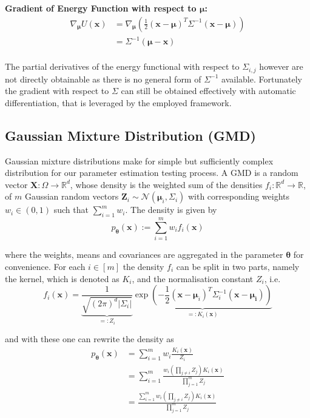 \textbf{Gradient of Energy Function with respect to $\bm{\mu}$:}
\[
\begin{aligned}
	\nabla_{\bm{\mu}} U(\bm{x}) &= \nabla_{\bm{\mu}} \left( \frac{1}{2} (\bm{x} - \bm{\mu})^T \Sigma^{-1} (\bm{x} - \bm{\mu}) \right) \\
	&= \Sigma^{-1} (\bm{\mu} - \bm{x}) \\
\end{aligned}
\]

The partial derivatives of the energy functional with respect to $\Sigma_{i,j}$ however are not directly obtainable as there is no general form of $\Sigma^{-1}$ available.
Fortunately the gradient with respect to $\Sigma$ can still be obtained effectively with automatic differentiation, that is leveraged by the employed framework.


\subsection{Gaussian Mixture Distribution (GMD)}

Gaussian mixture distributions make for simple but sufficiently complex distribution for our parameter estimation testing process.
A GMD is a random vector  $\bm{X} : \Omega \to \mathbb{R}^d$, whose density is the weighted sum of the densities $f_i : \mathbb{R}^d \to \mathbb{R}$, 
of $m$ Gaussian random vectors $\bm{Z}_i \sim \mathcal{N}(\bm{\mu}_i , \Sigma_i )$ with corresponding weights $w_i \in (0, 1)$ such that $\sum_{i = 1}^m w_i$.
The density is given by
\[
	p_{\bm{\theta}} (\bm{x}) := \sum_{i = 1}^m w_i f_i(\bm{x})
\]

where the weights, means and covariances are aggregated in the parameter $\bm{\theta}$ for convenience.
For each $i \in [m]$ the density $f_i$ can be split in two parts, namely the kernel, which is denoted as $K_i$, and the normalisation constant $Z_i$, i.e.
\[
	f_i (\bm{x}) 
	= \underbrace{ \frac{1}{\sqrt{(2\pi)^{d} |\Sigma_i |}} }_{=: Z_i} 
	\underbrace{ \exp \left( - \frac{1}{2} (\bm{x} - \bm{\mu}_i)^T \Sigma_i^{-1} (\bm{x} - \bm{\mu_i}) \right) }_{=: K_i (\bm{x})}
\]

and with these one can rewrite the density as
\[
\begin{aligned}
	p_{\bm{\theta}} (\bm{x}) 
	&= \sum_{i = 1}^m w_i \frac{K_i(\bm{x})}{Z_i} \\
	&= \sum_{i = 1}^m \frac{ w_i (\prod_{j \neq i} Z_j ) K_i(\bm{x}) }{ \prod_{j = 1}^m Z_j } \\
	&= \frac{ \sum_{i = 1}^m w_i (\prod_{j \neq i} Z_j ) K_i(\bm{x}) }{ \prod_{j = 1}^m Z_j } \\
\end{aligned}
\]

